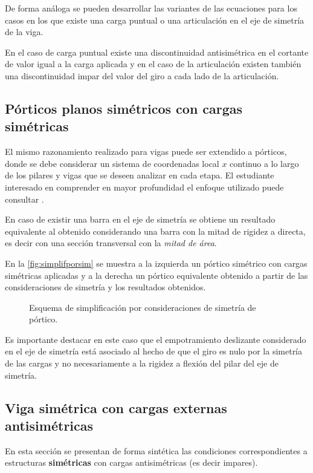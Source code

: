 De forma análoga se pueden desarrollar las variantes de las ecuaciones para los casos en los que existe una carga puntual o una articulación en el eje de simetría de la viga.

En el caso de carga puntual existe una discontinuidad antisimétrica en el cortante de valor igual a la carga aplicada y en el caso de la articulación existen también una discontinuidad impar del valor del giro a cada lado de la articulación. %
%


\subsection{Pórticos planos simétricos con cargas simétricas}

El mismo razonamiento realizado para vigas puede ser extendido a pórticos, donde se debe considerar un sistema de coordenadas local $x$ continuo a lo largo de los pilares y vigas que se deseen analizar en cada etapa. %
%
El estudiante interesado en comprender en mayor profundidad el enfoque utilizado puede consultar \citep{CerveraRuiz2002ii}. %

En caso de existir una barra en el eje de simetría se obtiene un resultado equivalente al obtenido considerando una barra con la mitad de rigidez a directa, es decir con una sección transversal con la \textit{mitad de área}. %
%



En la \autoref{fig:simplifporsim} se muestra a la izquierda un pórtico simétrico con cargas simétricas aplicadas y a la derecha un pórtico equivalente obtenido a partir de las consideraciones de simetría y los resultados obtenidos. %
%
\begin{figure}[htb]
\centering
\def\svgwidth{0.8\textwidth}

\caption{Esquema de simplificación por consideraciones de simetría de pórtico.}
\label{fig:simplifporsim}
\end{figure}

Es importante destacar en este caso que el empotramiento deslizante considerado en el eje de simetría está asociado al hecho de que el giro es nulo por la simetría de las cargas y no necesariamente a la rigidez a flexión del pilar del eje de simetría.


\subsection{Viga simétrica con cargas externas antisimétricas}

En esta sección se presentan de forma sintética las condiciones correspondientes a estructuras \textbf{simétricas} con cargas antisimétricas (es decir impares). %

